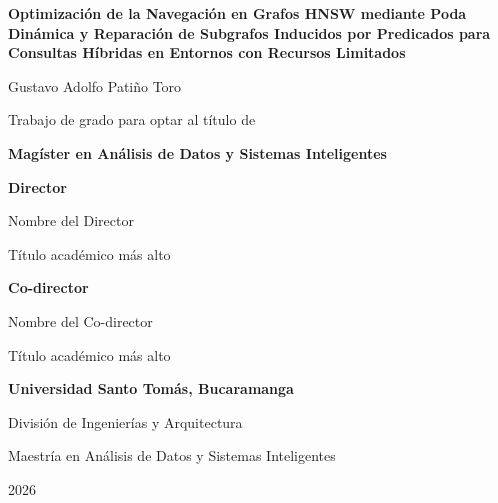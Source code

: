\documentclass[12pt,letterpaper,oneside]{report}
\newcommand{\tituloTrabajo}{Optimización de la Navegación en Grafos HNSW mediante Poda Dinámica y Reparación de Subgrafos Inducidos por Predicados para Consultas Híbridas en Entornos con Recursos Limitados}
\newcommand{\autorTrabajo}{Gustavo Adolfo Patiño Toro}
\newcommand{\directorTrabajo}{Nombre del Director}
\newcommand{\tituloDirector}{Título académico más alto}
\newcommand{\codirectorTrabajo}{Nombre del Co-director}
\newcommand{\tituloCodirector}{Título académico más alto}
\newcommand{\anioTrabajo}{2026}
\begin{document}
\hypersetup{pageanchor=false}
\begin{titlepage}
    \centering
    \vspace*{2cm}
    {\bfseries\Large \tituloTrabajo \par}
    \vspace{2cm}
    {\large \autorTrabajo \par}
    \vspace{2cm}
    {Trabajo de grado para optar al título de\par}
    {\bfseries Magíster en Análisis de Datos y Sistemas Inteligentes\par}
    \vspace{2cm}
    {\bfseries Director\par}
    {\directorTrabajo\par}
    {\tituloDirector\par}
    \vspace{1cm}
    {\bfseries Co-director\par}
    {\codirectorTrabajo\par}
    {\tituloCodirector\par}
    \vfill
    {\bfseries Universidad Santo Tomás, Bucaramanga\par}
    {División de Ingenierías y Arquitectura\par}
    {Maestría en Análisis de Datos y Sistemas Inteligentes\par}
    {\anioTrabajo\par}
\end{titlepage}
\hypersetup{pageanchor=true}

\tableofcontents
\clearpage
{}








\nocite{*}
\printbibliography[title={Referencias}]

\appendix

\end{document}
